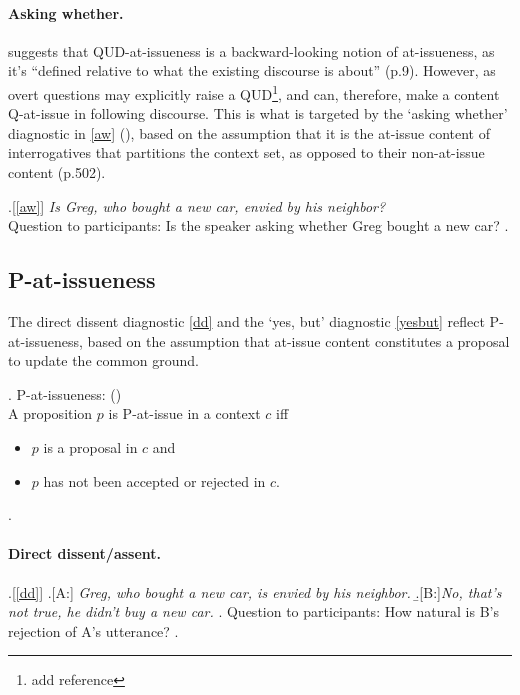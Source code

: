 \documentclass[12pt]{article}
\begin{document}
    \paragraph{Asking whether.}
    \citet{koev_notions_2018} suggests that QUD-at-issueness is a backward-looking notion of at-issueness, as it's \enquote{defined relative to what the existing discourse is about} (p.9).
    However, as overt questions may explicitly raise a QUD\footnote{add reference}, and can,
    therefore, make a content Q-at-issue in following discourse. This is what is targeted by the `asking whether' diagnostic in \ref{aw} (\citealt{tonhauser_how_2018}), based on the assumption that it is the at-issue content of interrogatives that partitions the context set, as opposed to their non-at-issue content (p.502).

    \ex.[\ref{aw}]%
        \emph{Is Greg, who bought a new car, envied by his neighbor?}\smallskip
    \\ Question to participants: Is the speaker asking whether Greg bought a new car?
    \z.
    

  \subsection{P-at-issueness}
    The direct dissent diagnostic \ref{dd} and the `yes, but' diagnostic \ref{yesbut} reflect P-at-issueness, based on the assumption that at-issue content constitutes a proposal to update the common ground.

     \ex. P-at-issueness: \hfill (\citealt{koev_apposition_2013,koev_notions_2018})\\
      A proposition $p$ is P-at-issue in a context $c$ iff
      \begin{itemize}
        \item $p$ is a proposal in $c$ and
        \item $p$ has not been accepted or rejected in $c$.
      \end{itemize}
    \z.

    \paragraph{Direct dissent/assent.}

      \ex.[\ref{dd}]
        \a.[A:] \emph{Greg, who bought a new car, is envied by his neighbor.}
        \b.[B:]\emph{No, that's not true, he didn't buy a new car.}
        \z.
      Question to participants: How natural is B's rejection of A's utterance?
      \z.
\end{document}
